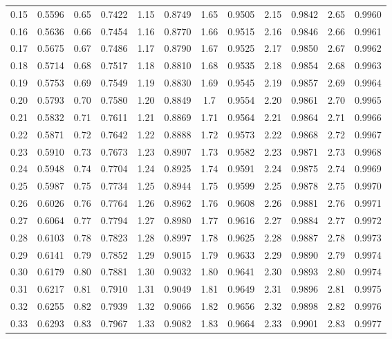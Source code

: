 \begin{table}
\begin{otherlanguage}{english}
\begin{tabular}{|C|C||C|C||C|C||C|C||C|C||C|C|}
0.15 & 0.5596 & 0.65 & 0.7422 & 1.15 & 0.8749 & 1.65 & 0.9505 & 2.15 & 0.9842 & 2.65 & 0.9960 \\[1ex]
0.16 & 0.5636 & 0.66 & 0.7454 & 1.16 & 0.8770 & 1.66 & 0.9515 & 2.16 & 0.9846 & 2.66 & 0.9961 \\
0.17 & 0.5675 & 0.67 & 0.7486 & 1.17 & 0.8790 & 1.67 & 0.9525 & 2.17 & 0.9850 & 2.67 & 0.9962 \\
0.18 & 0.5714 & 0.68 & 0.7517 & 1.18 & 0.8810 & 1.68 & 0.9535 & 2.18 & 0.9854 & 2.68 & 0.9963 \\
0.19 & 0.5753 & 0.69 & 0.7549 & 1.19 & 0.8830 & 1.69 & 0.9545 & 2.19 & 0.9857 & 2.69 & 0.9964 \\
0.20 & 0.5793 & 0.70 & 0.7580 & 1.20 & 0.8849 & 1.7 & 0.9554 & 2.20 & 0.9861 & 2.70& 0.9965 \\[1ex]
0.21 & 0.5832 & 0.71 & 0.7611 & 1.21 & 0.8869 & 1.71 & 0.9564 & 2.21 & 0.9864 & 2.71 & 0.9966 \\
0.22 & 0.5871 & 0.72 & 0.7642 & 1.22 & 0.8888 & 1.72 & 0.9573 & 2.22 & 0.9868 & 2.72 & 0.9967 \\
0.23 & 0.5910 & 0.73 & 0.7673 & 1.23 & 0.8907 & 1.73 & 0.9582 & 2.23 & 0.9871 & 2.73 & 0.9968 \\
0.24 & 0.5948 & 0.74 & 0.7704 & 1.24 & 0.8925 & 1.74 & 0.9591 & 2.24 & 0.9875 & 2.74 & 0.9969 \\
0.25 & 0.5987 & 0.75 & 0.7734 & 1.25 & 0.8944 & 1.75 & 0.9599 & 2.25 & 0.9878 & 2.75 & 0.9970 \\[1ex]
0.26 & 0.6026 & 0.76 & 0.7764 & 1.26 & 0.8962 & 1.76 & 0.9608 & 2.26 & 0.9881 & 2.76 & 0.9971 \\
0.27 & 0.6064 & 0.77 & 0.7794 & 1.27 & 0.8980 & 1.77 & 0.9616 & 2.27 & 0.9884 & 2.77 & 0.9972 \\
0.28 & 0.6103 & 0.78 & 0.7823 & 1.28 & 0.8997 & 1.78 & 0.9625 & 2.28 & 0.9887 & 2.78 & 0.9973 \\
0.29 & 0.6141 & 0.79 & 0.7852 & 1.29 & 0.9015 & 1.79 & 0.9633 & 2.29 & 0.9890 & 2.79 & 0.9974 \\
0.30 & 0.6179 & 0.80 & 0.7881 & 1.30 & 0.9032 & 1.80 & 0.9641 & 2.30 & 0.9893 & 2.80 & 0.9974 \\[1ex]
0.31 & 0.6217 & 0.81 & 0.7910 & 1.31 & 0.9049 & 1.81 & 0.9649 & 2.31 & 0.9896 & 2.81 & 0.9975 \\
0.32 & 0.6255 & 0.82 & 0.7939 & 1.32 & 0.9066 & 1.82 & 0.9656 & 2.32 & 0.9898 & 2.82 & 0.9976 \\
0.33 & 0.6293 & 0.83 & 0.7967 & 1.33 & 0.9082 & 1.83 & 0.9664 & 2.33 & 0.9901 & 2.83 & 0.9977 \\

\end{tabular}
\end{otherlanguage}
\end{table}
